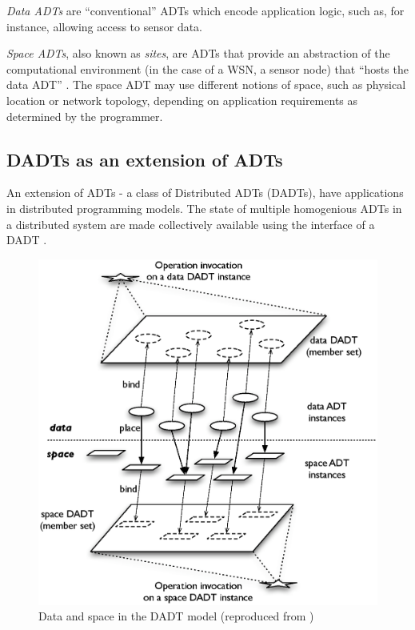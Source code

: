 \emph{Data ADTs} are ``conventional'' ADTs which encode application logic, such
as, for instance, allowing access to sensor data.

\emph{Space ADTs}, also known as \emph{sites}, are ADTs that provide an
abstraction of the computational environment (in the case of a WSN, a sensor
node) that ``hosts the data ADT'' \cite{migliavacca_DADT:2006}. The space ADT may
use different notions of space, such as physical location or network topology,
depending on application requirements as determined by the programmer.

\subsection{DADTs as an extension of ADTs} \label{subsec:DADTsConcepts}
An extension of ADTs - a class of Distributed ADTs (DADTs), have applications 
in distributed programming models. The state of multiple homogenious ADTs in a
distributed system are made collectively available using the interface of a DADT
\cite{migliavacca_DADT:2006}. 

\begin{figure}[h]
\centering
\includegraphics[scale=0.65]{img/DADTs.eps} 
\caption[Data and space in the DADT model]{Data and space in the DADT model (reproduced from 
\cite{migliavacca_DADT:2006})}
\label{Fig:DADTs}
\end{figure}

